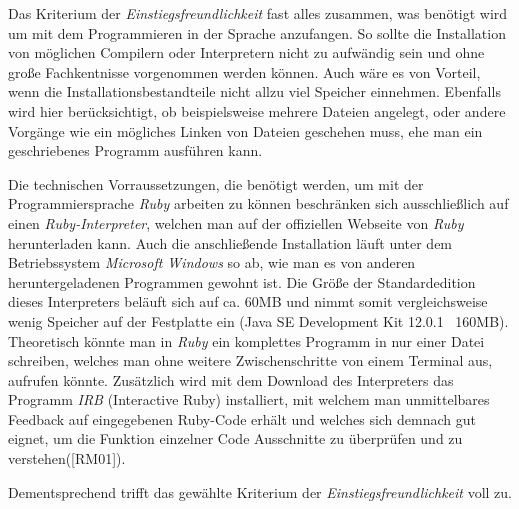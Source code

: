 \documentclass[12pt,DIV=14, version=first, BCOR=10mm,a4paper,twoside,parskip=half-,headsepline,headinclude]{scrartcl}
\begin{document}
\begin{flushleft}
Das Kriterium der \textit{Einstiegsfreundlichkeit} fast alles zusammen, was benötigt wird um mit dem Programmieren in der Sprache anzufangen. So sollte die Installation von möglichen Compilern oder Interpretern nicht zu aufwändig sein und ohne große Fachkentnisse vorgenommen werden können. Auch wäre es von Vorteil, wenn die Installationsbestandteile nicht allzu viel Speicher einnehmen. Ebenfalls wird hier berücksichtigt, ob beispielsweise mehrere Dateien angelegt, oder andere Vorgänge wie ein mögliches Linken von Dateien geschehen muss, ehe man ein geschriebenes Programm ausführen kann.

Die technischen Vorraussetzungen, die benötigt werden, um mit der Programmiersprache \textit{\glqq Ruby\grqq} arbeiten zu können beschränken sich ausschließlich auf einen \textit{Ruby-Interpreter}, welchen man auf der offiziellen Webseite von \textit{\glqq Ruby\grqq} herunterladen kann. Auch die anschließende Installation läuft unter dem Betriebssystem \textit{Microsoft Windows} so ab, wie man es von anderen heruntergeladenen Programmen gewohnt ist. Die Größe der Standardedition dieses Interpreters beläuft sich auf ca. 60MB und nimmt somit vergleichsweise wenig Speicher auf der Festplatte ein (Java SE Development Kit 12.0.1 ~160MB).
Theoretisch könnte man in \textit{\glqq Ruby\grqq} ein komplettes Programm in nur einer Datei schreiben, welches man ohne weitere Zwischenschritte von einem Terminal aus, aufrufen könnte. Zusätzlich wird mit dem Download des Interpreters das Programm \textit{IRB} (Interactive Ruby) installiert, mit welchem man unmittelbares Feedback auf eingegebenen Ruby-Code erhält und welches sich demnach gut eignet, um die Funktion einzelner Code Ausschnitte zu überprüfen und zu verstehen([RM01]).

Dementsprechend trifft das gewählte Kriterium der \textit{Einstiegsfreundlichkeit} voll zu.
\end{flushleft}
\end{document}
